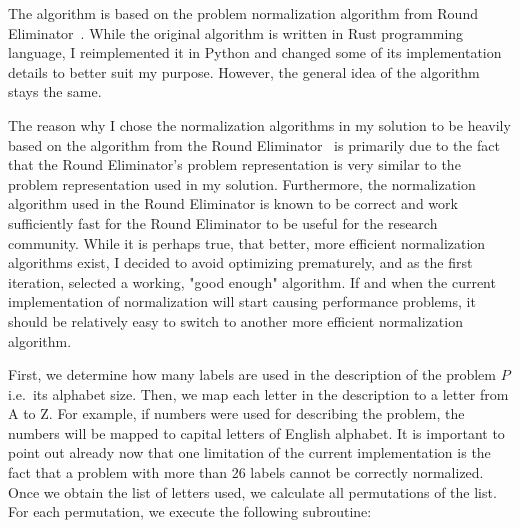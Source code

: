 The algorithm is based on the problem normalization algorithm
from Round Eliminator~\cite{Olivetti2020}. While the original
algorithm is written in Rust programming language, I
reimplemented it in Python and changed some of its
implementation details to better suit my purpose.
However, the general idea of the algorithm stays the same.

The reason why I chose the normalization algorithms in my solution
to be heavily based on the algorithm from the Round Eliminator~\cite{Olivetti2020}
is primarily due to
the fact that the Round Eliminator's problem representation is very similar to the problem
representation used in my solution. Furthermore, the normalization
algorithm used in the Round Eliminator is known to be correct and work
sufficiently fast for the Round Eliminator to be useful for the research community.
While it is perhaps true, that better, more efficient normalization
algorithms exist, I decided to avoid optimizing prematurely, and
as the first iteration, selected a working, "good enough" algorithm.
If and when the current implementation of normalization will start
causing performance problems, it should be relatively easy to
switch to another more efficient normalization algorithm.

First, we determine how many labels are used in the description of the
problem $P$ i.e.\ its alphabet size. Then, we map each letter in the description
to a letter from A to Z. For example, if numbers were used for describing
the problem, the numbers will be mapped to capital letters of
English alphabet. It is important to point out already now that
one limitation of the current implementation is the fact that
a problem with more than 26 labels cannot be correctly normalized.
Once we obtain the list of letters used, we calculate all
permutations of the list. For each permutation, we execute the following
subroutine:

